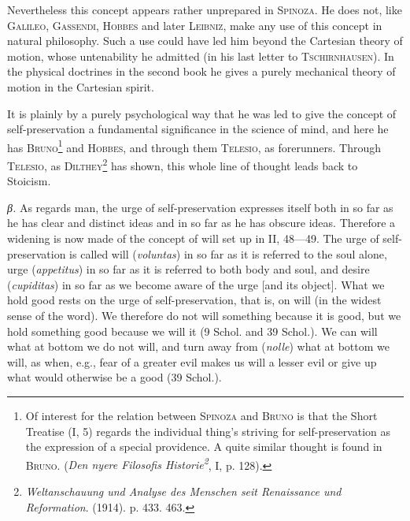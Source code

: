 \documentclass[12pt]{article}
\begin{document}
Nevertheless this concept appears rather unprepared in \textsc{Spinoza}. He does not, like
\textsc{Galileo}, \textsc{Gassendi}, \textsc{Hobbes} and later \textsc{Leibniz}, make any use
of this concept in natural philosophy. Such a use could have led him beyond the Cartesian theory
of motion, whose untenability he admitted (in his last letter to \textsc{Tschirnhausen}). In the
physical doctrines in the second book he gives a purely mechanical theory of motion in the
Cartesian spirit.

It is plainly by a purely psychological way that he was led to give the concept of
self-preservation a fundamental significance in the science of mind, and here he has
\textsc{Bruno}\footnote{Of interest for the relation between \textsc{Spinoza} and
\textsc{Bruno} is that the Short Treatise (I, 5) regards the individual thing's striving for
self-preservation as the expression of a special providence. A quite similar thought is found in
\textsc{Bruno}. (\textit{Den nyere Filosofis Historie\textsuperscript{2}}, I, p. 128).} and
\textsc{Hobbes}, and through them \textsc{Telesio}, as forerunners. Through \textsc{Telesio},
as \textsc{Dilthey}\footnote{\textit{Weltanschauung und Analyse des Menschen seit Renaissance
und Reformation}. (1914). p. 433. 463.} has shown, this whole line of thought leads back to
Stoicism.

\textit{β.} As regards man, the urge of self-preservation expresses itself both in so far as he
has clear and distinct ideas and in so far as he has obscure ideas. Therefore a widening is now
made of the concept of will set up in II, 48---49. The urge of self-preservation is called will
(\textit{voluntas}) in so far as it is referred to the soul alone, urge (\textit{appetitus}) in
so far as it is referred to both body and soul, and desire (\textit{cupiditas}) in so far as we
become aware of the urge [and its object]. What we hold good rests on the urge of
self-preservation, that is, on will (in the widest sense of the word). We therefore do not will
something because it is good, but we hold something good because we will it (9 Schol. and 39
Schol.). We can will what at bottom we do not will, and turn away from (\textit{nolle}) what at
bottom we will, as when, e.g., fear of a greater evil makes us will a lesser evil or give up what
would otherwise be a good (39 Schol.).
\end{document}
